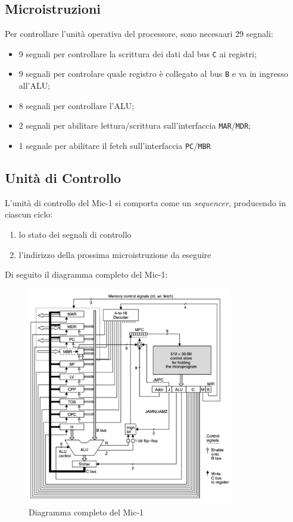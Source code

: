 \subsection{Microistruzioni}
Per controllare l'unità operativa del processore, sono necesaari 29 segnali:
\begin{itemize}
    \item 9 segnali per controllare la scrittura dei dati dal bus \texttt{C} ai registri;
    \item 9 segnali per controlare quale registro è collegato al bus \texttt{B} e va in ingresso all'ALU;
    \item 8 segnali per controllare l'ALU;
    \item 2 segnali per abilitare lettura/scrittura sull'interfaccia \texttt{MAR}/\texttt{MDR};
    \item 1 segnale per abilitare il fetch sull'interfaccia \texttt{PC}/\texttt{MBR}
\end{itemize}

\subsection{Unità di Controllo}
L'unità di controllo del Mic-1 si comporta come un \textit{sequencer}, producendo in ciascun ciclo:
\begin{enumerate}
    \item lo stato dei segnali di controllo
    \item l'indirizzo della prossima microistruzione da eseguire
\end{enumerate}
Di seguito il diagramma completo del Mic-1:
\begin{figure}[H]
	\centering
	\includegraphics[width=0.8\textwidth]{img/Esercizio_9/diag_mic-1}
	\caption{Diagramma completo del Mic-1}
	\label{diag_mic-1} 
\end{figure}

